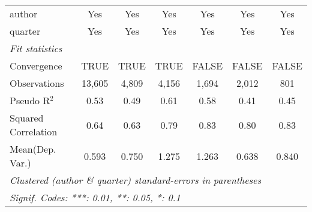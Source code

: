 \begin{tabular}{lcccccc}
   author                                                     & Yes           & Yes           & Yes           & Yes           & Yes            & Yes\\  
   quarter                                                    & Yes           & Yes           & Yes           & Yes           & Yes            & Yes\\  
   \midrule
   \emph{Fit statistics}\\
   Convergence                                                &TRUE           & TRUE          & TRUE          & FALSE         & FALSE          & FALSE\\  
   Observations                                               & 13,605        & 4,809         & 4,156         & 1,694         & 2,012          & 801\\  
   Pseudo R$^2$                                               & 0.53          & 0.49          & 0.61          & 0.58          & 0.41           & 0.45\\  
   Squared Correlation                                        & 0.64          & 0.63          & 0.79          & 0.83          & 0.80           & 0.83\\  
Mean(Dep. Var.) & 0.593 & 0.750 & 1.275 & 1.263 & 0.638 & 0.840 \\
   \midrule \midrule
   \multicolumn{7}{l}{\emph{Clustered (author \& quarter) standard-errors in parentheses}}\\
   \multicolumn{7}{l}{\emph{Signif. Codes: ***: 0.01, **: 0.05, *: 0.1}}\\
\end{tabular}
\par\endgroup
